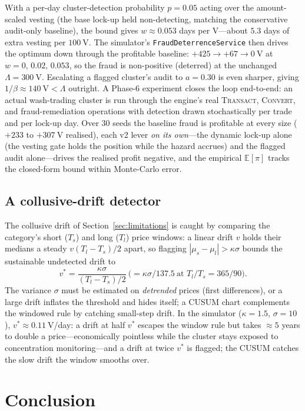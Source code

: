 \documentclass[11pt]{article}
\theoremstyle{plain}
\theoremstyle{definition}
\theoremstyle{remark}
\newcommand{\V}{\mathrm{V}}
\begin{document}
With a per-day cluster-detection probability $p=0.05$ acting over the amount-scaled vesting (the base lock-up held non-detecting, matching the conservative audit-only baseline), the bound gives $w\approx0.053$ days per V---about $5.3$ days of extra vesting per $100~\V$. The simulator's \texttt{FraudDeterrenceService} then drives the optimum down through the profitable baseline: $+425\to+67\to0~\V$ at $w=0,\,0.02,\,0.053$, so the fraud is non-positive (deterred) at the unchanged $\Lambda=300~\V$. Escalating a flagged cluster's audit to $a=0.30$ is even sharper, giving $1/\beta\approx140~\V<\Lambda$ outright. A Phase-6 experiment closes the loop end-to-end: an actual wash-trading cluster is run through the engine's real \textsc{Transact}, \textsc{Convert}, and fraud-remediation operations with detection drawn stochastically per trade and per lock-up day. Over $30$ seeds the baseline fraud is profitable at every size ($+233$ to $+307~\V$ realised), each v2 lever \emph{on its own}---the dynamic lock-up alone (the vesting gate holds the position while the hazard accrues) and the flagged audit alone---drives the realised profit negative, and the empirical $\mathbb E[\pi]$ tracks the closed-form bound within Monte-Carlo error.

\subsection{A collusive-drift detector}

The collusive drift of Section~\ref{sec:limitations} is caught by comparing the category's short ($T_s$) and long ($T_l$) price windows: a linear drift $v$ holds their medians a steady $v(T_l-T_s)/2$ apart, so flagging $|\mu_s-\mu_l|>\kappa\sigma$ bounds the sustainable undetected drift to
\[
v^\ast=\frac{\kappa\sigma}{(T_l-T_s)/2}\ \bigl(=\kappa\sigma/137.5\ \text{at }T_l/T_s=365/90\bigr).
\]
The variance $\sigma$ must be estimated on \emph{detrended} prices (first differences), or a large drift inflates the threshold and hides itself; a CUSUM chart complements the windowed rule by catching small-step drift. In the simulator ($\kappa=1.5$, $\sigma=10$), $v^\ast\approx0.11~\V$/day: a drift at half $v^\ast$ escapes the window rule but takes ${\approx}5$ years to double a price---economically pointless while the cluster stays exposed to concentration monitoring---and a drift at twice $v^\ast$ is flagged; the CUSUM catches the slow drift the window smooths over.

\section{Conclusion}
\end{document}
